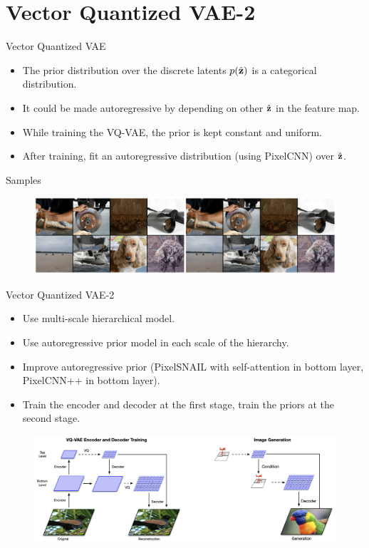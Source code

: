 \section{Vector Quantized VAE-2}
\begin{frame}{Vector Quantized VAE}
	\begin{itemize}
		\item The prior distribution over the discrete latents $p(\hat{\mathbf{z}})$ is a categorical distribution.
		\item It could be made autoregressive by depending on other $\hat{\mathbf{z}}$ in the feature map. 
		\item While training the VQ-VAE, the prior is kept constant and uniform. 
		\item After training, fit an autoregressive distribution (using PixelCNN) over $\hat{\mathbf{z}}$.
	\end{itemize}
	\begin{block}{Samples}
		\begin{figure}
			\centering
			\includegraphics[width=\linewidth]{figs/vqvae_results}
		\end{figure}
	\end{block}

\end{frame}
\begin{frame}{Vector Quantized VAE-2}
	\begin{itemize}
		\item Use multi-scale hierarchical model.
		\item Use autoregressive prior model in each scale of the hierarchy.
		\item Improve autoregressive prior (PixelSNAIL with self-attention in bottom layer, PixelCNN++ in bottom layer).
		\item Train the encoder and decoder at the first stage, train the priors at the second stage.
	\end{itemize}
	\begin{figure}
		\centering
		\includegraphics[width=\linewidth]{figs/vqvae2}
	\end{figure}
\end{frame}
